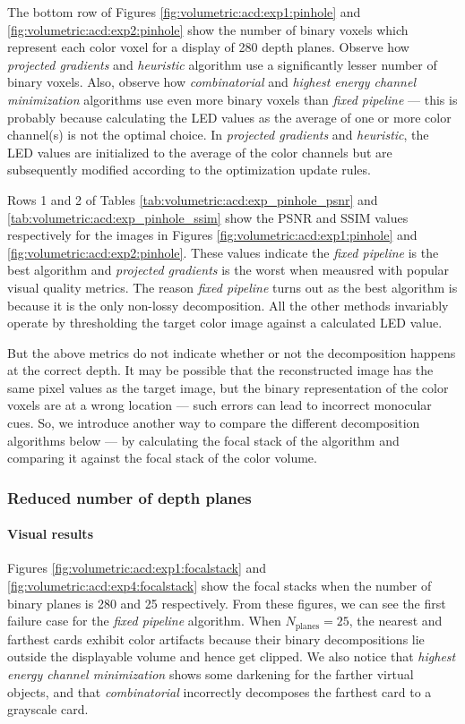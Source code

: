 The bottom row of Figures \ref{fig:volumetric:acd:exp1:pinhole} and \ref{fig:volumetric:acd:exp2:pinhole} show the number of binary voxels which represent each color voxel for a display of 280 depth planes. Observe how \emph{projected gradients} and \emph{heuristic} algorithm use a significantly lesser number of binary voxels. Also, observe how \emph{combinatorial} and \emph{highest energy channel minimization} algorithms use even more binary voxels than \emph{fixed pipeline} --- this is probably because calculating the LED values as the average of one or more color channel(s) is not the optimal choice. In \emph{projected gradients} and \emph{heuristic}, the LED values are initialized to the average of the color channels but are subsequently modified according to the optimization update rules. 

Rows 1 and 2 of Tables \ref{tab:volumetric:acd:exp_pinhole_psnr} and \ref{tab:volumetric:acd:exp_pinhole_ssim} show the PSNR and SSIM values respectively for the images in Figures \ref{fig:volumetric:acd:exp1:pinhole} and \ref{fig:volumetric:acd:exp2:pinhole}. These values indicate the \emph{fixed pipeline} is the best algorithm and \emph{projected gradients} is the worst when meausred with popular visual quality metrics. The reason \emph{fixed pipeline} turns out as the best algorithm is because it is the only non-lossy decomposition. All the other methods invariably operate by thresholding the target color image against a calculated LED value. 

But the above metrics do not indicate whether or not the decomposition happens at the correct depth. It may be possible that the reconstructed image has the same pixel values as the target image, but the binary representation of the color voxels are at a wrong location --- such errors can lead to incorrect monocular cues. So, we introduce another way to compare the different decomposition algorithms below --- by calculating the focal stack of the algorithm and comparing it against the focal stack of the color volume. 

\subsubsection{Reduced number of depth planes}



\paragraph{Visual results}
Figures \ref{fig:volumetric:acd:exp1:focalstack} and \ref{fig:volumetric:acd:exp4:focalstack} show the focal stacks when the number of binary planes is 280 and 25 respectively. From these figures, we can see the first failure case for the \emph{fixed pipeline} algorithm. When $N_{\text{planes}}=25$, the nearest and farthest cards exhibit color artifacts because their binary decompositions lie outside the displayable volume and hence get clipped. We also notice that \emph{highest energy channel minimization} shows some darkening for the farther virtual objects, and that \emph{combinatorial} incorrectly decomposes the farthest card to a grayscale card. 

